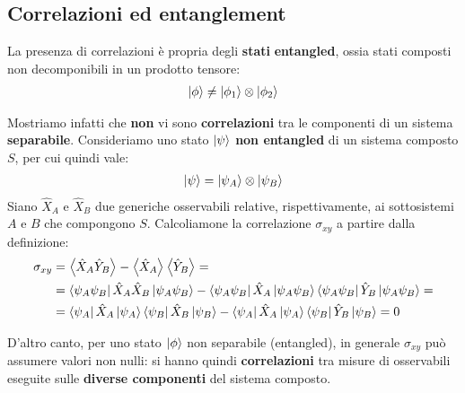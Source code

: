 \documentclass[../../InformazioneQuantistica.tex]{subfiles}
\begin{document}
\subsection{Correlazioni ed entanglement}
La presenza di correlazioni è propria degli \textbf{stati} \textbf{entangled}, ossia stati composti non decomponibili in un prodotto tensore:
\begin{align*}
\Ket{\phi} \neq \Ket{\phi_1}\otimes \Ket{\phi_2}
\end{align*}

Mostriamo infatti che \textbf{non} vi sono \textbf{correlazioni} tra le componenti di un sistema \textbf{separabile}. Consideriamo uno stato $\Ket{\psi}$ \textbf{non entangled} di un sistema composto $S$, per cui quindi vale:
\begin{align*}
\Ket{\psi}=\Ket{\psi_A}\otimes \Ket{\psi_B}
\end{align*}
Siano $\hat{X}_A$ e $\hat{X}_B$ due generiche osservabili relative, rispettivamente, ai sottosistemi $A$ e $B$ che compongono $S$. Calcoliamone la correlazione $\sigma_{xy}$ a partire dalla definizione:
\begin{align*}
\sigma_{xy} &= \left\langle{\hat{X}_A \hat{Y}_B}\right\rangle - \left\langle{\hat{X}_A}\right\rangle \left\langle{\hat{Y}_B}\right\rangle = \\
&=\Bra{\psi_A \psi_B} \hat{X}_A \hat{X}_B \Ket{\psi_A \psi_B}- \Bra{\psi_A \psi_B}\hat{X}_A \Ket{\psi_A\psi_B}\Bra{\psi_A\psi_B}\hat{Y}_B \Ket{\psi_A\psi_B} =\\
&=\Bra{\psi_A}\hat{X}_A \Ket{\psi_A}\Bra{\psi_B}\hat{X}_B \Ket{\psi_B} - \Bra{\psi_A}\hat{X}_A\Ket{\psi_A}\Bra{\psi_B}\hat{Y}_B\Ket{\psi_B} = 0
\end{align*}

D'altro canto, per uno stato $\Ket{\phi}$ non separabile (entangled), in generale $\sigma_{xy}$ può assumere valori non nulli: si hanno quindi \textbf{correlazioni} tra misure di osservabili eseguite sulle \textbf{diverse componenti} del sistema composto.
\end{document}
